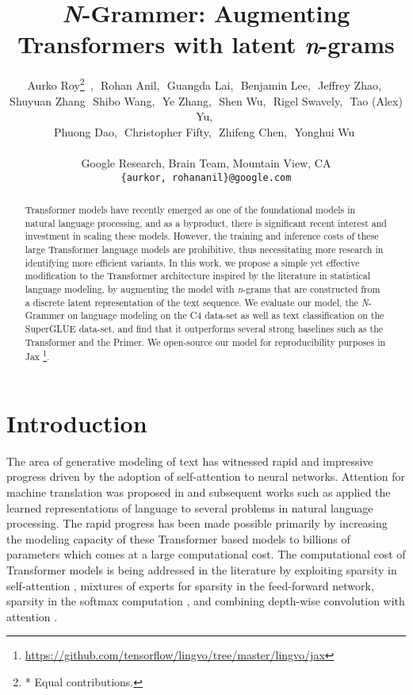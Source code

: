 \documentclass[11pt]{article}
\title{\textit{N}-Grammer: Augmenting Transformers with latent 
\textit{n}-grams}
\author{{\normalfont Aurko Roy}\thanks{* Equal contributions.}\,\,\,,\,\,
  {\normalfont Rohan Anil},\,\, 
  {\normalfont Guangda Lai},\,\,  
  {\normalfont Benjamin Lee},\,\,
  {\normalfont Jeffrey Zhao},\,\,   \\  
  {\normalfont Shuyuan Zhang}\,\,
  {\normalfont Shibo Wang},\,\,  
  Ye Zhang,\,\, 
  Shen Wu,\,\,  
  Rigel Swavely,\,\,  
  Tao (Alex) Yu,\,\,   \\
  Phuong Dao,\,\,  
  Christopher Fifty,\,\, 
  Zhifeng Chen,\,\,  
  Yonghui Wu\,\,  \\
  \\
  {Google Research, Brain Team, Mountain View, CA}\\
  \texttt{\{aurkor, rohananil\}@google.com} \\
}
\begin{document}
\maketitle
\begin{abstract}
Transformer models have recently emerged as one of the foundational models in natural language processing, and as a byproduct, there is significant
recent interest and investment in scaling these models. However, the 
training and inference costs of these large Transformer language models 
are prohibitive, thus
necessitating more research in identifying more efficient variants.
In this work, we propose a simple yet effective modification to the Transformer architecture 
inspired by the literature in statistical language modeling, 
by augmenting the model with \textit{n}-grams that are constructed from a 
discrete latent representation of the text sequence. 
We evaluate our model, the \textit{N}-Grammer on language modeling on the 
C4 data-set as well as text classification on the SuperGLUE data-set,
and find that it outperforms several strong
baselines such as the Transformer and the Primer.
We open-source our model for reproducibility purposes in Jax  \footnote{\url{https://github.com/tensorflow/lingvo/tree/master/lingvo/jax}}.
\end{abstract}

\section{Introduction}
The area of generative modeling of text has witnessed rapid and impressive 
progress driven by the adoption of self-attention to neural networks. Attention
for machine translation was proposed in \citet{bahdanau2014neural, cho2014learning, vaswani2017attention} 
and subsequent works such as  \citet{radford2018improving,devlin2018bert} applied the learned 
representations of language to several problems in natural language processing. The rapid progress has been made possible primarily by increasing the modeling capacity of these Transformer based models to billions of 
parameters  \citep{brown2020language} which comes at a large computational cost. The computational cost of 
Transformer models is being addressed in the literature by exploiting 
sparsity in self-attention  
\citep{ainslie2020etc, zaheer2020big, roy2021efficient},  
mixtures of experts \citep{shazeer2017outrageously,lepikhin2020gshard, fedus2021switch} for sparsity in the feed-forward
network, sparsity in the softmax computation \citep{correia2019adaptively},
and combining depth-wise convolution with attention \citep{wu2021cvt, so2021primer}. 
\end{document}

